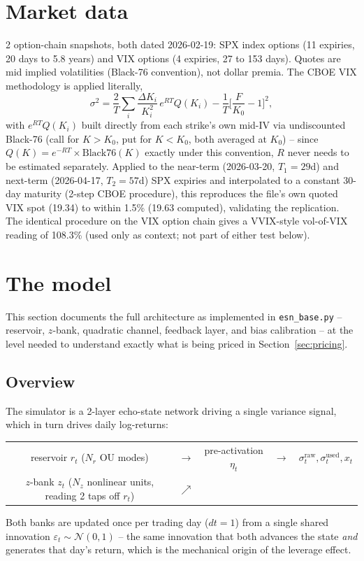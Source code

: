 \documentclass[11pt]{article}
\begin{document}
\tableofcontents

\section{Market data}
\label{sec:data}
2 option-chain snapshots, both dated 2026-02-19: SPX index options
(11 expiries, 20 days to 5.8 years) and VIX options (4 expiries, 27 to
153 days). Quotes are mid implied volatilities (Black-76 convention),
not dollar premia. The CBOE VIX methodology is applied literally,
\begin{equation}
\sigma^2 = \frac{2}{T}\sum_i \frac{\Delta K_i}{K_i^2}\, e^{RT}Q(K_i)
- \frac{1}{T}\Big[\frac{F}{K_0}-1\Big]^2,
\label{eq:cboe}
\end{equation}
with $e^{RT}Q(K_i)$ built directly from each strike's own mid-IV via
undiscounted Black-76 (call for $K>K_0$, put for $K<K_0$, both
averaged at $K_0$) -- since $Q(K)=e^{-RT}\times\text{Black76}(K)$
exactly under this convention, $R$ never needs to be estimated
separately. Applied to the near-term (2026-03-20, $T_1=29$d) and
next-term (2026-04-17, $T_2=57$d) SPX expiries and interpolated to a
constant 30-day maturity (2-step CBOE procedure), this reproduces the
file's own quoted VIX spot (19.34) to within 1.5\% (19.63 computed),
validating the replication. The identical procedure on the VIX option
chain gives a VVIX-style vol-of-VIX reading of 108.3\% (used only as
context; not part of either test below).

\FloatBarrier
\section{The model}
\label{sec:model}
This section documents the full architecture as implemented in
\texttt{esn\_base.py} -- reservoir, $z$-bank, quadratic channel,
feedback layer, and bias calibration -- at the level needed to
understand exactly what is being priced in Section~\ref{sec:pricing}.

\subsection{Overview}
The simulator is a 2-layer echo-state network driving a single
variance signal, which in turn drives daily log-returns:
\begin{center}
\begin{tabular}{ccccc}
reservoir $r_t$ ($N_r$ OU modes) & $\to$ & pre-activation $\eta_t$ &
$\to$ & $\sigma_t^{\text{raw}}, \sigma_t^{\text{used}}, x_t$ \\
$z$-bank $z_t$ ($N_z$ nonlinear units, reading 2 taps off $r_t$) &
$\nearrow$ & & &
\end{tabular}
\end{center}
Both banks are updated once per trading day ($dt=1$) from a single
shared innovation $\varepsilon_t\sim\mathcal N(0,1)$ -- the same
innovation that both advances the state \emph{and} generates that
day's return, which is the mechanical origin of the leverage effect.
\end{document}
